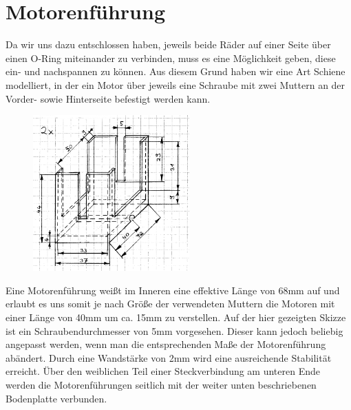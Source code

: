 \section{Motorenführung}
Da wir uns dazu entschlossen haben, jeweils beide Räder auf einer Seite über einen O-Ring miteinander zu verbinden, muss es eine Möglichkeit geben, diese ein- und nachspannen zu können. Aus diesem Grund haben wir eine Art Schiene modelliert, in der ein Motor über jeweils eine Schraube mit zwei Muttern an der Vorder- sowie Hinterseite befestigt werden kann.
\begin{figure}
	\includegraphics[width=6cm,angle=0]{content/pictures/motorenfuehrung.png}
\end{figure}
Eine Motorenführung weißt im Inneren eine effektive Länge von 68mm auf und erlaubt es uns somit je nach Größe der verwendeten Muttern die Motoren mit einer Länge von 40mm um ca. 15mm zu verstellen. Auf der hier gezeigten Skizze ist ein Schraubendurchmesser von 5mm vorgesehen. Dieser kann jedoch beliebig angepasst werden, wenn man die entsprechenden Maße der Motorenführung abändert. Durch eine Wandstärke von 2mm wird eine ausreichende Stabilität erreicht. Über den weiblichen Teil einer Steckverbindung am unteren Ende werden die Motorenführungen seitlich mit der weiter unten beschriebenen Bodenplatte verbunden.

